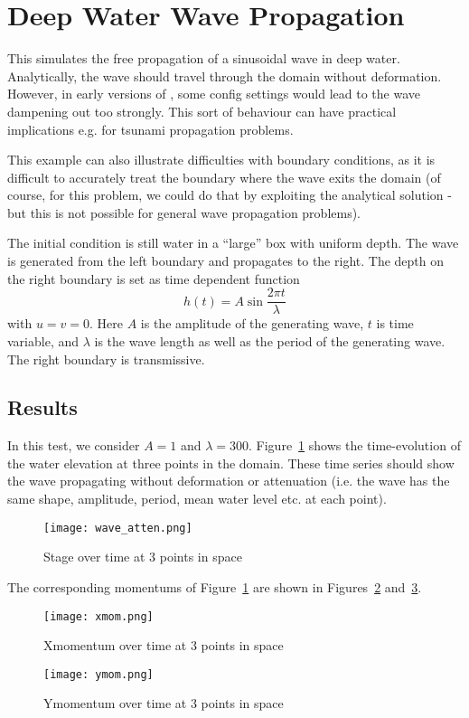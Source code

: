 \section{Deep Water Wave Propagation}
This simulates the free propagation of a sinusoidal wave in deep water. Analytically, the wave should travel through the domain without deformation. However, in early versions of \anuga{}, some config settings would lead to the wave dampening out too strongly. This sort of behaviour can have practical implications e.g. for tsunami propagation problems.  

This example can also illustrate difficulties with boundary conditions, as it is difficult to accurately treat the boundary where the wave exits the domain (of course, for this problem, we could do that by exploiting the analytical solution - but this is not possible for general wave propagation problems). 


The initial condition is still water in a ``large'' box with uniform depth. The wave is generated from the left boundary and propagates to the right. The depth on the right boundary is set as time dependent function
\begin{equation}
h(t) = A\sin{\frac{2\pi t}{\lambda}}
\end{equation}
with $u=v=0$. Here $A$ is the amplitude of the generating wave, $t$ is time variable, and $\lambda$ is the wave length as well as the period of the generating wave.
The right boundary is transmissive.


\subsection{Results}
In this test, we consider $A=1$ and $\lambda=300$.
Figure~\ref{fig:stagewave} shows the time-evolution of the water elevation at three points in the domain. These time series should show the wave propagating without deformation or attenuation (i.e. the wave has the same shape, amplitude, period, mean water level etc. at each point).  
\begin{figure}
\begin{center}
\texttt{[image: wave\_atten.png]}
\caption{Stage over time at 3 points in space}
\label{fig:stagewave}
\end{center}
\end{figure}


The corresponding momentums of Figure~\ref{fig:stagewave} are shown in Figures~\ref{fig:xmom} and~\ref{fig:ymom}.
\begin{figure}
\begin{center}
\texttt{[image: xmom.png]}
\caption{Xmomentum over time at 3 points in space}
\label{fig:xmom}
\end{center}
\end{figure}
\begin{figure}
\begin{center}
\texttt{[image: ymom.png]}
\caption{Ymomentum over time at 3 points in space}
\label{fig:ymom}
\end{center}
\end{figure}



\endinput
